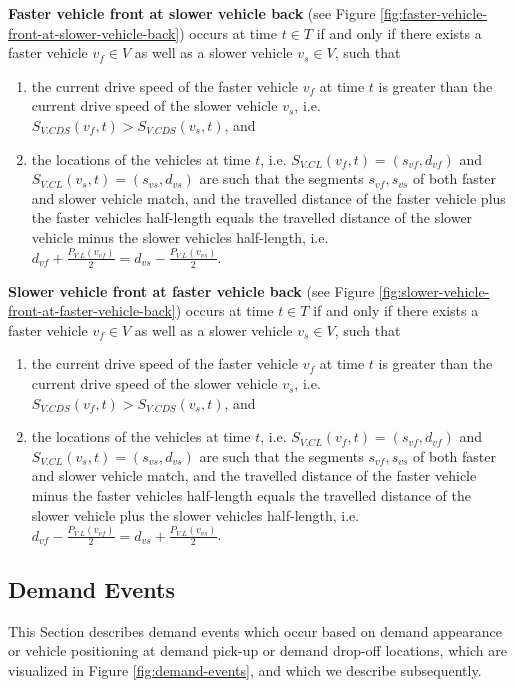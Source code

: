 \documentclass[graybox]{svmult}
\begin{document}
\noindent
\textbf{Faster vehicle front at slower vehicle back} (see Figure \ref{fig:faster-vehicle-front-at-slower-vehicle-back})
occurs at time $t \in T$ if and only if there exists a faster vehicle $v_{f} \in V$ as well as a slower vehicle $v_{s} \in V$, such that 
\begin{enumerate}
\item the current drive speed of the faster vehicle $v_{f}$ at time $t$ is greater than the current drive speed of the slower vehicle $v_{s}$, i.e. $ S_{V.CDS}(v_{f},t) > S_{V.CDS}(v_{s},t)$, and
\item the locations of the vehicles at time $t$, i.e. $S_{V.CL}(v_{f},t) = (s_{vf}, d_{vf})$ and  $S_{V.CL}(v_{s},t) = (s_{vs}, d_{vs})$ are such that the segments $s_{vf}, s_{vs}$ of both faster and slower vehicle match, and the travelled distance of the faster vehicle plus the faster vehicles half-length equals the travelled distance of the slower vehicle minus the slower vehicles half-length, i.e. $d_{vf} + \frac{P_{V.L}(v_{vf})}{2} = d_{vs} - \frac{P_{V.L}(v_{vs})}{2}$.
\end{enumerate}
\vspace{4mm}

\noindent
\textbf{Slower vehicle front at faster vehicle back} (see Figure \ref{fig:slower-vehicle-front-at-faster-vehicle-back})
occurs at time $t \in T$ if and only if there exists a faster vehicle $v_{f} \in V$ as well as a slower vehicle $v_{s} \in V$, such that 
\begin{enumerate}
	\item the current drive speed of the faster vehicle $v_{f}$ at time $t$ is greater than the current drive speed of the slower vehicle $v_{s}$, i.e. $ S_{V.CDS}(v_{f},t) > S_{V.CDS}(v_{s},t)$, and
	\item the locations of the vehicles at time $t$, i.e. $S_{V.CL}(v_{f},t) = (s_{vf}, d_{vf})$ and  $S_{V.CL}(v_{s},t) = (s_{vs}, d_{vs})$ are such that the segments $s_{vf}, s_{vs}$ of both faster and slower vehicle match, and the travelled distance of the faster vehicle minus the faster vehicles half-length equals the travelled distance of the slower vehicle plus the slower vehicles half-length, i.e. $d_{vf} - \frac{P_{V.L}(v_{vf})}{2} = d_{vs} + \frac{P_{V.L}(v_{vs})}{2}$.
\end{enumerate}
\vspace{-2mm}

\subsection{Demand Events}
\label{sec:demand-events}
This Section describes demand events which occur based on demand appearance or vehicle positioning at demand pick-up or demand drop-off locations, which are visualized in Figure \ref{fig:demand-events}, and which we describe subsequently.
\end{document}
